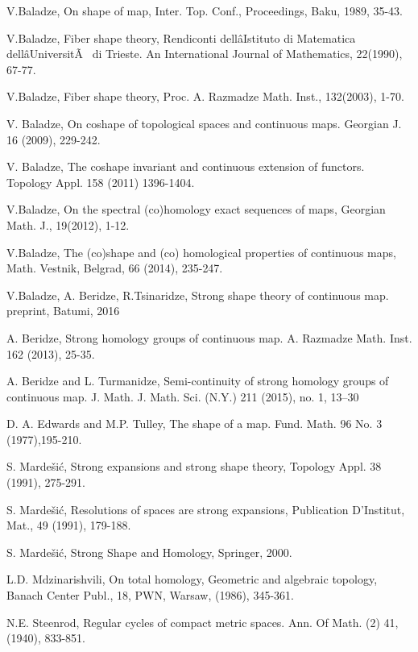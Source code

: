 \documentclass[10pt]{article}
\theoremstyle{definition}
\begin{document}
\begin{thebibliography}{108}
 V.Baladze, On shape of map, Inter. Top. Conf., Proceedings, Baku, 1989, 35-43.

 V.Baladze, Fiber shape theory, Rendiconti dellâIstituto di Matematica dellâUniversitÃ  di Trieste. An International Journal of Mathematics, 22(1990), 67-77.

 V.Baladze, Fiber shape theory, Proc. A. Razmadze Math. Inst., 132(2003), 1-70.

 V. Baladze, On coshape of topological spaces and continuous maps. Georgian J. 16 (2009), 229-242.

 V. Baladze, The coshape invariant and continuous extension of functors. Topology Appl. 158 (2011) 1396-1404.

 V.Baladze, On the spectral (co)homology exact sequences of maps, Georgian Math. J., 19(2012), 1-12.

 V.Baladze, The (co)shape and (co) homological properties of continuous maps, Math. Vestnik, Belgrad, 66 (2014), 235-247.

 V.Baladze, A. Beridze, R.Tsinaridze, Strong shape theory of continuous map. preprint, Batumi, 2016 

 A. Beridze, Strong homology groups of continuous map. A. Razmadze Math. Inst. 162 (2013), 25-35.

 A. Beridze and L. Turmanidze, Semi-continuity of strong homology groups of continuous map. J. Math. J. Math. Sci. (N.Y.) 211 (2015), no. 1, 13--30

 D. A. Edwards and M.P. Tulley, The shape of a map. Fund. Math. 96   No. 3 (1977),195-210.

S. Marde\v{s}i\'{c}, Strong expansions and strong shape theory, Topology Appl. 38 (1991), 275-291.

S. Marde\v{s}i\'{c}, Resolutions of spaces are strong expansions, Publication D'Institut, Mat., 49 (1991), 179-188.

S. Marde\v{s}i\'{c}, Strong Shape and Homology, Springer, 2000.

 L.D. Mdzinarishvili, On total homology, Geometric and algebraic topology, Banach Center Publ., 18, PWN, Warsaw, (1986), 345-361.

 N.E. Steenrod, Regular cycles of compact metric spaces. Ann. Of Math. (2) 41, (1940), 833-851.

\end{thebibliography}
\end{document}
